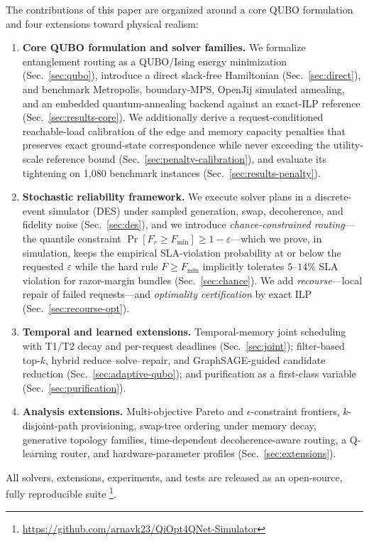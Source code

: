 \documentclass[twocolumn]{article}
\begin{document}
The contributions of this paper are organized around a core QUBO
formulation and four extensions toward physical realism:
\begin{enumerate}
  \item \textbf{Core QUBO formulation and solver families.}  We
    formalize entanglement routing as a QUBO/Ising energy
    minimization (Sec.~\ref{sec:qubo}), introduce a direct
    slack-free Hamiltonian
    (Sec.~\ref{sec:direct}), and benchmark Metropolis, boundary-MPS,
    OpenJij simulated annealing, and an embedded quantum-annealing
    backend against an exact-ILP reference (Sec.~\ref{sec:results-core}).
    We additionally derive a request-conditioned reachable-load
    calibration of the edge and memory capacity penalties that preserves
    exact ground-state correspondence while never exceeding the
    utility-scale reference bound (Sec.~\ref{sec:penalty-calibration}),
    and evaluate its tightening on 1,080 benchmark instances
    (Sec.~\ref{sec:results-penalty}).
  \item \textbf{Stochastic reliability framework.}  We execute solver
    plans in a discrete-event simulator (DES) under sampled
    generation, swap, decoherence, and fidelity noise
    (Sec.~\ref{sec:des}), and we introduce
    \emph{chance-constrained routing}---the quantile constraint
    $\Pr[F_r \ge F_{\min}] \ge 1-\varepsilon$---which we prove, in
    simulation, keeps the empirical SLA-violation probability at or
    below the requested $\varepsilon$ while the hard rule
    $F \ge F_{\min}$ implicitly tolerates $5$--$14\%$ SLA violation for
    razor-margin bundles (Sec.~\ref{sec:chance}).  We add
    \emph{recourse}---local repair of failed requests---and
    \emph{optimality certification} by exact ILP
    (Sec.~\ref{sec:recourse-opt}).
  \item \textbf{Temporal and learned extensions.}  Temporal-memory
    joint scheduling with T1/T2 decay and per-request deadlines
    (Sec.~\ref{sec:joint}); filter-based top-$k$, hybrid
    reduce--solve--repair, and GraphSAGE-guided candidate reduction
    (Sec.~\ref{sec:adaptive-qubo}); and purification as a first-class
    variable (Sec.~\ref{sec:purification}).
  \item \textbf{Analysis extensions.}  Multi-objective Pareto and
    $\epsilon$-constraint frontiers, $k$-disjoint-path provisioning,
    swap-tree ordering under memory decay, generative topology
    families, time-dependent decoherence-aware routing, a
    Q-learning router, and hardware-parameter profiles
    (Sec.~\ref{sec:extensions}).
\end{enumerate}
All solvers, extensions, experiments, and tests are released as an
open-source, fully reproducible suite%
\footnote{\url{https://github.com/arnavk23/QiOpt4QNet-Simulator}}.
\end{document}
